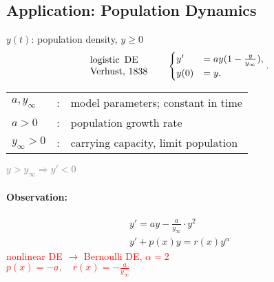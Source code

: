 \documentclass[]{article}
\begin{document}
\begin{enumerate}
\subsection{Application: Population Dynamics}
$y(t)$: population density,  $y\ge 0$
\[
	\parbox{8em}{logistic DE$~~~~~~$ Verhust, 1838}
	\begin{cases} 
		y' &= ay(1- \frac{y}{y_\infty}), \\
	 y(0)&= y.
	\end{cases}
.\]
\begin{tabular}{@{}l l l}
	$a,y_\infty$ & : & model parameters; constant in time\\
	$a >0$ & : & population growth rate\\
	$y_\infty >0$ & : & carrying capacity, limit population\\
\end{tabular}
\textcolor{gray}{$ y > y_\infty \Rightarrow y' < 0$}
\paragraph{Observation:} \[
	\begin{split}
		y'=ay- \frac{a}{y_\infty} \cdot y ^{2}\\ 
		y'+p(x)y=r(x)y ^{\alpha}
	\end{split}
\]
	\textcolor{red}{nonlinear DE $\rightarrow$ Bernoulli DE, $\alpha = 2$}\\
	\textcolor{red}{$p(x)=-a,\quad r(x)=- \frac{a}{y_\infty}$}
\end{enumerate}
\end{document}
